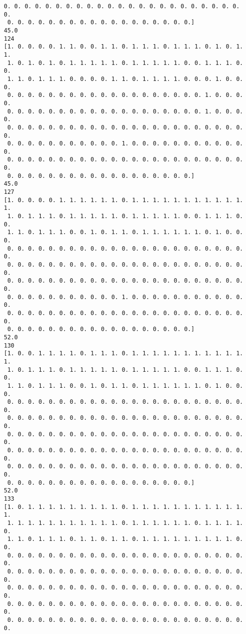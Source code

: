 \documentclass[11pt]{article}
\begin{document}
\begin{Verbatim}[commandchars=\\\{\}]
 0. 0. 0. 0. 0. 0. 0. 0. 0. 0. 0. 0. 0. 0. 0. 0. 0. 0. 0. 0. 0. 0. 0. 0.
 0. 0. 0. 0. 0. 0. 0. 0. 0. 0. 0. 0. 0. 0. 0. 0. 0. 0.]
45.0
124
[1. 0. 0. 0. 0. 1. 1. 0. 0. 1. 1. 0. 1. 1. 1. 0. 1. 1. 1. 0. 1. 0. 1. 1.
 1. 0. 1. 0. 1. 0. 1. 1. 1. 1. 1. 0. 1. 1. 1. 1. 1. 0. 0. 1. 1. 1. 0. 0.
 1. 1. 0. 1. 1. 1. 0. 0. 0. 0. 1. 1. 0. 1. 1. 1. 1. 0. 0. 0. 1. 0. 0. 0.
 0. 0. 0. 0. 0. 0. 0. 0. 0. 0. 0. 0. 0. 0. 0. 0. 0. 0. 0. 1. 0. 0. 0. 0.
 0. 0. 0. 0. 0. 0. 0. 0. 0. 0. 0. 0. 0. 0. 0. 0. 0. 0. 0. 1. 0. 0. 0. 0.
 0. 0. 0. 0. 0. 0. 0. 0. 0. 0. 0. 0. 0. 0. 0. 0. 0. 0. 0. 0. 0. 0. 0. 0.
 0. 0. 0. 0. 0. 0. 0. 0. 0. 0. 0. 1. 0. 0. 0. 0. 0. 0. 0. 0. 0. 0. 0. 0.
 0. 0. 0. 0. 0. 0. 0. 0. 0. 0. 0. 0. 0. 0. 0. 0. 0. 0. 0. 0. 0. 0. 0. 0.
 0. 0. 0. 0. 0. 0. 0. 0. 0. 0. 0. 0. 0. 0. 0. 0. 0. 0.]
45.0
127
[1. 0. 0. 0. 0. 1. 1. 1. 1. 1. 1. 0. 1. 1. 1. 1. 1. 1. 1. 1. 1. 1. 1. 1.
 1. 0. 1. 1. 1. 0. 1. 1. 1. 1. 1. 0. 1. 1. 1. 1. 1. 0. 0. 1. 1. 1. 0. 0.
 1. 1. 0. 1. 1. 1. 0. 0. 1. 0. 1. 1. 0. 1. 1. 1. 1. 1. 1. 0. 1. 0. 0. 0.
 0. 0. 0. 0. 0. 0. 0. 0. 0. 0. 0. 0. 0. 0. 0. 0. 0. 0. 0. 0. 0. 0. 0. 0.
 0. 0. 0. 0. 0. 0. 0. 0. 0. 0. 0. 0. 0. 0. 0. 0. 0. 0. 0. 0. 0. 0. 0. 0.
 0. 0. 0. 0. 0. 0. 0. 0. 0. 0. 0. 0. 0. 0. 0. 0. 0. 0. 0. 0. 0. 0. 0. 0.
 0. 0. 0. 0. 0. 0. 0. 0. 0. 0. 0. 1. 0. 0. 0. 0. 0. 0. 0. 0. 0. 0. 0. 0.
 0. 0. 0. 0. 0. 0. 0. 0. 0. 0. 0. 0. 0. 0. 0. 0. 0. 0. 0. 0. 0. 0. 0. 0.
 0. 0. 0. 0. 0. 0. 0. 0. 0. 0. 0. 0. 0. 0. 0. 0. 0. 0.]
52.0
130
[1. 0. 0. 1. 1. 1. 1. 0. 1. 1. 1. 0. 1. 1. 1. 1. 1. 1. 1. 1. 1. 1. 1. 1.
 1. 0. 1. 1. 1. 0. 1. 1. 1. 1. 1. 0. 1. 1. 1. 1. 1. 0. 0. 1. 1. 1. 0. 0.
 1. 1. 0. 1. 1. 1. 0. 0. 1. 0. 1. 1. 0. 1. 1. 1. 1. 1. 1. 0. 1. 0. 0. 0.
 0. 0. 0. 0. 0. 0. 0. 0. 0. 0. 0. 0. 0. 0. 0. 0. 0. 0. 0. 0. 0. 0. 0. 0.
 0. 0. 0. 0. 0. 0. 0. 0. 0. 0. 0. 0. 0. 0. 0. 0. 0. 0. 0. 0. 0. 0. 0. 0.
 0. 0. 0. 0. 0. 0. 0. 0. 0. 0. 0. 0. 0. 0. 0. 0. 0. 0. 0. 0. 0. 0. 0. 0.
 0. 0. 0. 0. 0. 0. 0. 0. 0. 0. 0. 0. 0. 0. 0. 0. 0. 0. 0. 0. 0. 0. 0. 0.
 0. 0. 0. 0. 0. 0. 0. 0. 0. 0. 0. 0. 0. 0. 0. 0. 0. 0. 0. 0. 0. 0. 0. 0.
 0. 0. 0. 0. 0. 0. 0. 0. 0. 0. 0. 0. 0. 0. 0. 0. 0. 0.]
52.0
133
[1. 0. 1. 1. 1. 1. 1. 1. 1. 1. 1. 0. 1. 1. 1. 1. 1. 1. 1. 1. 1. 1. 1. 1.
 1. 1. 1. 1. 1. 1. 1. 1. 1. 1. 1. 0. 1. 1. 1. 1. 1. 1. 0. 1. 1. 1. 1. 0.
 1. 1. 0. 1. 1. 1. 0. 1. 1. 0. 1. 1. 0. 1. 1. 1. 1. 1. 1. 1. 1. 1. 0. 0.
 0. 0. 0. 0. 0. 0. 0. 0. 0. 0. 0. 0. 0. 0. 0. 0. 0. 0. 0. 0. 0. 0. 0. 0.
 0. 0. 0. 0. 0. 0. 0. 0. 0. 0. 0. 0. 0. 0. 0. 0. 0. 0. 0. 0. 0. 0. 0. 0.
 0. 0. 0. 0. 0. 0. 0. 0. 0. 0. 0. 0. 0. 0. 0. 0. 0. 0. 0. 0. 0. 0. 0. 0.
 0. 0. 0. 0. 0. 0. 0. 0. 0. 0. 0. 0. 0. 0. 0. 0. 0. 0. 0. 0. 0. 0. 0. 0.
 0. 0. 0. 0. 0. 0. 0. 0. 0. 0. 0. 0. 0. 0. 0. 0. 0. 0. 0. 0. 0. 0. 0. 0.

\end{Verbatim}
\end{document}
